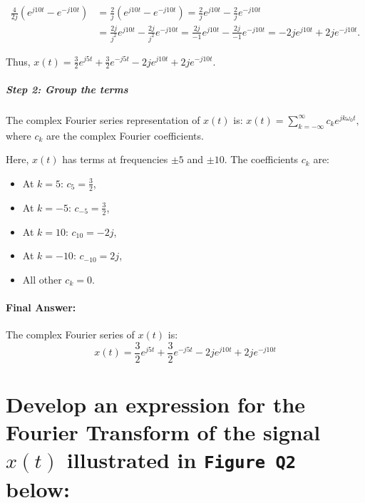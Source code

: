 \documentclass[11pt]{article}
\providecommand{\tightlist}{%
      \setlength{\itemsep}{0pt}\setlength{\parskip}{0pt}}
\begin{document}
\begin{align*}
\frac{4}{2j}(e^{j10t} - e^{-j10t}) &=  \frac{2}{j}(e^{j10t} - e^{-j10t}) = \frac{2}{j}e^{j10t} - \frac{2}{j}e^{-j10t} \\
&= \frac{2j}{j^2}e^{j10t} - \frac{2j}{j^2}e^{-j10t} = \frac{2j}{-1}e^{j10t} - \frac{2j}{-1}e^{-j10t} = -2je^{j10t} + 2je^{-j10t}.
\end{align*}

Thus,
\(x(t) = \frac{3}{2}e^{j5t} + \frac{3}{2}e^{-j5t} - 2je^{j10t} + 2je^{-j10t}.\)

\subparagraph{Step 2: Group the terms}\label{step-2-group-the-terms}

The complex Fourier series representation of \(x(t)\) is:
\(x(t) = \sum_{k=-\infty}^\infty c_k e^{jk\omega_0 t},\) where \(c_k\)
are the complex Fourier coefficients.

Here, \(x(t)\) has terms at frequencies \(\pm 5\) and \(\pm 10\). The
coefficients \(c_k\) are:

\begin{itemize}
\tightlist
\item
  At \(k = 5\): \(c_5 = \frac{3}{2}\),
\item
  At \(k = -5\): \(c_{-5} = \frac{3}{2}\),
\item
  At \(k = 10\): \(c_{10} = -2j\),
\item
  At \(k = -10\): \(c_{-10} = 2j\),
\item
  All other \(c_k = 0\).
\end{itemize}

\paragraph{Final Answer:}\label{final-answer}

The complex Fourier series of \(x(t)\) is: \[\boxed{
x(t) = \frac{3}{2}e^{j5t} + \frac{3}{2}e^{-j5t} - 2je^{j10t} + 2je^{-j10t}
}\]

    

    \section{\texorpdfstring{Develop an expression for the Fourier Transform
of the signal \(x(t)\) illustrated in \texttt{Figure\ Q2}
below:}{Develop an expression for the Fourier Transform of the signal x(t) illustrated in Figure Q2 below:}}\label{develop-an-expression-for-the-fourier-transform-of-the-signal-xt-illustrated-in-figure-q2-below}
\end{document}
